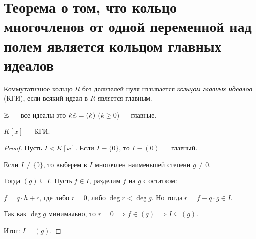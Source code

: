 \section{Теорема о том, что кольцо многочленов от одной переменной над полем является кольцом главных идеалов}

\begin{definition}
    Коммутативное кольцо $R$ без делителей нуля называется \textit{кольцом главных идеалов} (КГИ), если всякий идеал в $R$ является главным.
\end{definition}

\begin{example}
    $\mathbb{Z}$ --- все идеалы это $k\mathbb{Z} = (k)$ ($k \geq 0$) --- главные.
\end{example}

\begin{proposal}
    $K[x]$ --- КГИ.
\end{proposal}

\begin{proof}
    Пусть $I \lhd K[x]$. Если $I = \{0\}$, то $I = (0)$ --- главный.

    Если $I \neq \{0\}$, то выберем в $I$ многочлен наименьшей степени $g \neq 0$.

    Тогда $(g) \subseteq I$. Пусть $f \in I$, разделим $f$ на $g$ с остатком:

    $f = q \cdot h + r$, где либо $r = 0$, либо $\deg r < \deg g$. Но тогда $r = f - q \cdot g \in I$.

    Так как $\deg g$ минимально, то $r = 0 \implies f \in (g) \implies I \subseteq (g)$.

    Итог: $I = (g)$.
\end{proof}
